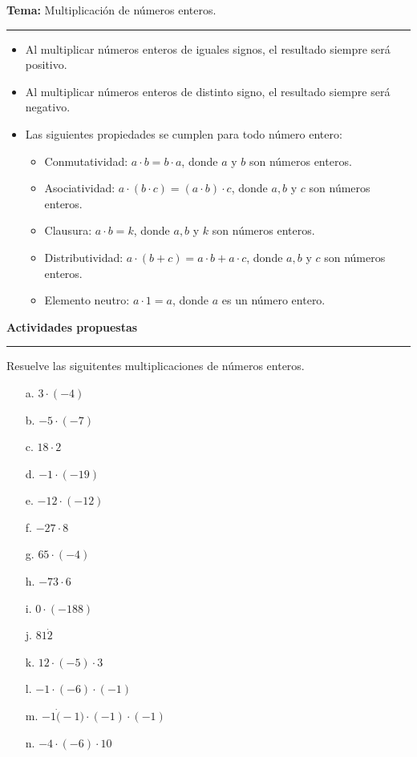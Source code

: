 \documentclass[spanish,letterpaper, 11pt, addpoints, answers]{exam}
\begin{document}
\begin{questions}
\newpage
  \vspace{0.1in}
  \parbox{6in}{
  \textbf{Tema:} Multiplicación de números enteros.}
  \vspace{0.15in}
  \hrule 
  
  \begin{itemize}
    \item Al multiplicar números enteros de iguales signos, el resultado siempre será positivo.
  
    \item Al multiplicar números enteros de distinto signo, el resultado siempre será negativo.
    \item Las siguientes propiedades se cumplen para todo número entero:
    \begin{itemize}
      \item Conmutatividad: $a\cdot b=b\cdot a$, donde $a$ y $b$ son números enteros.
      \item Asociatividad: $a\cdot (b\cdot c)=(a\cdot b)\cdot c$, donde $a,b$ y $c$ son números enteros.
      \item Clausura: $a\cdot b=k$, donde $a,b$ y $k$ son números enteros.
      \item Distributividad: $a\cdot (b+c)=a\cdot b+a\cdot c$, donde $a,b$ y $c$ son números enteros.
      \item Elemento neutro: $a\cdot 1=a$, donde $a$ es un número entero. 
    \end{itemize}
    
  \end{itemize}
  
  \parbox{6in}{
  \textbf{Actividades propuestas}}
  \vspace{0.15in}
  \hrule 

  \question Resuelve las siguitentes multiplicaciones de números enteros.

  \begin{multicols}{2}
    
 
  \begin{itemize}
    \item[a.] $3\cdot (-4)$
    \item[b.] $-5\cdot (-7)$
    \item[c.] $18\cdot 2$
    \item[d.] $-1\cdot (-19)$
    \item[e.] $-12\cdot (-12)$
    \item[f.] $-27\cdot 8$
    \item[g.] $65\cdot (-4)$
    \item[h.] $-73\cdot 6$
    \item[i.] $0\cdot (-188)$
    \item[j.] $81\dot 2$
    \item[k.] $12\cdot (-5)\cdot 3$
    \item[l.] $-1\cdot (-6)\cdot (-1)$
    \item[m.] $-1\dot (-1)\cdot (-1)\cdot (-1)$
    \item[n.] $-4\cdot (-6)\cdot 10$      
  \end{itemize}
 \end{multicols}


\end{questions}
\end{document}
